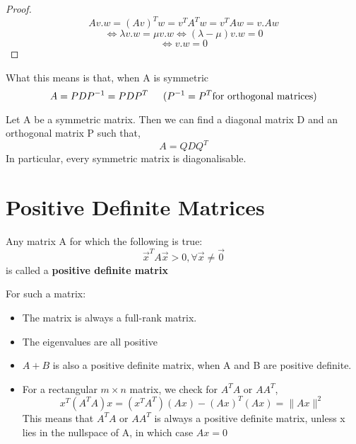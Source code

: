 \documentclass[twoside]{report}
\begin{document}
\begin{proof}
	\[
		Av .  w = (Av)^T w = v^T A^Tw = v^T Aw = v . Aw
	\]
	\[
	\iff \lambda v . w = \mu v . w \iff (\lambda - \mu) v.w = 0
	\]
	\[
		\iff v . w  = 0
	\]
\end{proof}
What this means is that, when A is symmetric
\[
   A = PDP^{-1} = PDP^T \indent (P^{-1} = P^T \text{for orthogonal matrices})
\]
\begin{theorem}
   Let A be a symmetric matrix. Then we can find a diagonal matrix D and an orthogonal matrix P such that,
\[
   A = QDQ^T
\]	
In particular, every symmetric matrix is diagonalisable.
\end{theorem}
\section{Positive Definite Matrices}
\begin{definition}
Any matrix A for which the following is true:	
	\begin{displaymath}
   \vec{x}^T A\vec{x} > 0, \forall \vec{x} \neq \vec{0}
	\end{displaymath}
is called a \textbf{positive definite matrix}
\end{definition}

For such a matrix: 
\begin{itemize}
	\item The matrix is always a full-rank matrix. 
	\item The eigenvalues are all positive
	\item $A+B$ is also a positive definite matrix, when A and B are positive definite. 
	\item For a rectangular $m \times n$ matrix, we check for $A^TA \text{ or } AA^T$, \[
	      x^T(A^TA)x = (x^TA^T)(Ax) - (Ax)^T(Ax) = \|{Ax}\|^2
	\]
	This means that $A^TA$ or $AA^T$ is always a positive definite matrix, unless x lies in the nullspace of A, in which case $Ax = 0$
\end{itemize}
\end{document}
